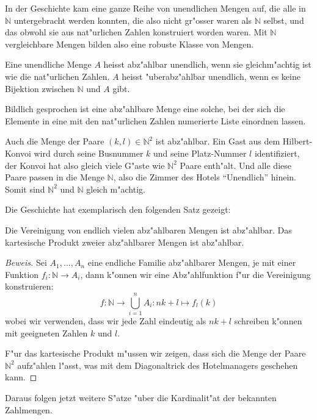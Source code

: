 In der Geschichte kam eine ganze Reihe von unendlichen Mengen auf, die
alle in $\mathbb N$ untergebracht werden konnten, die also nicht
gr"osser waren als $\mathbb N$ selbst, und das obwohl sie aus nat"urlichen
Zahlen konstruiert worden waren. Mit $\mathbb N$ vergleichbare Mengen
bilden also eine robuste Klasse von Mengen.

\begin{definition}
Eine unendliche Menge $A$ heisst abz"ahlbar unendlich, wenn sie
gleichm"achtig ist wie die nat"urlichen Zahlen. $A$ heisst
"uberabz"ahlbar unendlich, wenn es keine Bijektion zwischen
$\mathbb N$ und $A$ gibt.
\end{definition}
Bildlich gesprochen ist eine abz"ahlbare Menge eine solche,
bei der sich die Elemente in eine mit den nat"urlichen Zahlen numerierte
Liste einordnen lassen.

Auch die Menge der Paare $(k,l)\in \mathbb N^2$ ist abz"ahlbar.
Ein Gast aus dem Hilbert-Konvoi wird durch seine Busnummer $k$ und
seine Platz-Nummer $l$ identifiziert, der Konvoi hat also gleich
viele G"aste wie $\mathbb N^2$ Paare enth"alt. Und alle diese Paare
passen in die Menge $\mathbb N$, also die Zimmer des Hotels ``Unendlich''
hinein. Somit sind $\mathbb N^2$ und $\mathbb N$ gleich m"achtig.

Die Geschichte hat exemplarisch den folgenden Satz gezeigt:

\begin{satz}Die Vereinigung von endlich vielen abz"ahlbaren
Mengen ist abz"ahlbar. Das kartesische Produkt zweier abz"ahlbarer
Mengen ist abz"ahlbar.
\end{satz}

\begin{proof}[Beweis]
Sei $A_1,\dots,A_n$ eine endliche Familie abz"ahlbarer Mengen,
je mit einer Funktion $f_i\colon \mathbb N\to A_i$, dann
k"onnen wir eine Abz"ahlfunktion f"ur die Vereinigung konstruieren:
\[
f\colon \mathbb N\to\bigcup_{i=1}^n A_i\colon nk+l \mapsto f_l(k)
\]
wobei wir verwenden, dass wir jede Zahl eindeutig als $nk+l$
schreiben k"onnen mit geeigneten Zahlen $k$ und $l$.

F"ur das kartesische Produkt m"ussen wir zeigen, dass sich die
Menge der Paare $\mathbb N^2$ aufz"ahlen l"asst, was mit dem
Diagonaltrick des Hotelmanagers geschehen kann.
\end{proof}

Daraus folgen jetzt weitere S"atze "uber die Kardinalit"at
der bekannten Zahlmengen.


